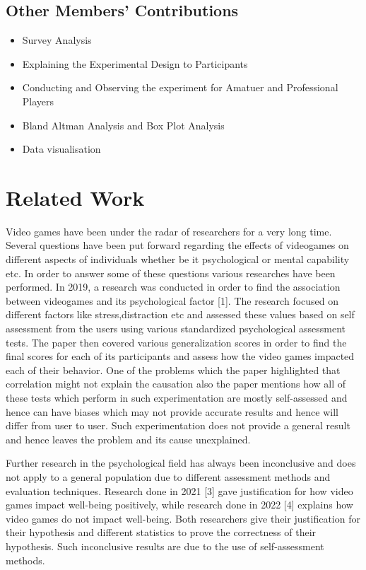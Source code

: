 \documentclass[conference]{IEEEtran}
\begin{document}
\subsection{Other Members' Contributions}
\begin{itemize}
    \item Survey Analysis
    \item Explaining the Experimental Design to Participants
    \item Conducting and Observing the experiment for Amatuer and Professional Players
    \item Bland Altman Analysis and Box Plot Analysis
    \item Data visualisation
\end{itemize}
\section{Related Work}
\begin{flushleft}
    Video games have been under the radar of researchers for a very long time. Several questions have been put forward regarding the effects of videogames on different aspects of individuals whether be it psychological or mental capability etc. In order to answer some of these questions various researches have been performed.
\newline
In 2019, a research was conducted in order to find the association between videogames and its psychological factor [1]. The research focused on different factors like stress,distraction etc and assessed these values based on self assessment from the users using various standardized psychological assessment tests. The paper then covered various generalization scores in order to find the final scores for each of its participants and assess how the video games impacted each of their behavior. One of the problems which the paper highlighted that correlation might not explain the causation also the paper mentions how all of these tests which perform in such experimentation are mostly self-assessed and hence can have biases which may not provide accurate results and hence will differ from user to user. Such experimentation does not provide a general result and hence leaves the problem and its cause unexplained.
\end{flushleft}
\newline
\newline
\begin{flushleft}
    
Further research in the psychological field has always been inconclusive and does not apply to a general population due to different assessment methods and evaluation techniques. Research done in 2021 [3] gave justification for how video games impact well-being positively, while research done in 2022 [4] explains how video games do not impact well-being. Both researchers give their justification for their hypothesis and different statistics to prove the correctness of their hypothesis. Such inconclusive results are due to the use of self-assessment methods.
\end{flushleft}
\end{document}

